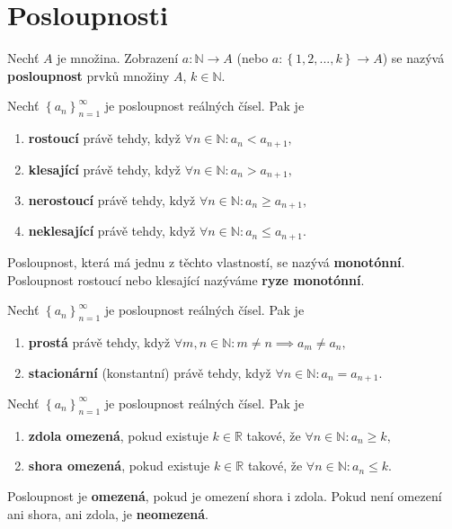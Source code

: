 \section{Posloupnosti}
\begin{definition}
Nechť $A$ je množina. Zobrazení $a:\mathbb N\to A$ (nebo $a:\left \{ 1,2,...,k \right \} \to A$)
se nazývá \textbf{posloupnost} prvků množiny $A$, $k\in \mathbb N.$
\end{definition}

\begin{definition}
Nechť $\left \{ a_n \right \}_{n=1}^\infty $ je posloupnost reálných čísel. Pak je
\begin{enumerate}[$i.$]
\item \textbf{rostoucí} právě tehdy, když $\forall n \in \mathbb N: a_n< a_{n+1},$
\item \textbf{klesající} právě tehdy, když $\forall n \in \mathbb N: a_n> a_{n+1},$
\item \textbf{nerostoucí} právě tehdy, když $\forall n \in \mathbb N: a_n\geq a_{n+1},$
\item \textbf{neklesající} právě tehdy, když $\forall n \in \mathbb N: a_n\leq a_{n+1}.$
\end{enumerate}
Posloupnost, která má jednu z těchto vlastností, se nazývá \textbf{monotónní}.
Posloupnost rostoucí nebo klesající nazýváme \textbf{ryze monotónní}.
\end{definition}

\begin{definition}
    Nechť $\left \{ a_n \right \}_{n=1}^\infty $ je posloupnost reálných čísel. Pak je
    \begin{enumerate}[$i.$]
    \item \textbf{prostá} právě tehdy, když $\forall m,n\in \mathbb N: m\ne n \implies a_m\ne a_n,$
   	\item \textbf{stacionární} (konstantní) právě tehdy, když $\forall n \in \mathbb N:a_n = a_{n+1}.$
    \end{enumerate}
\end{definition}

\begin{definition}
    Nechť $\left \{ a_n \right \}_{n=1}^\infty $ je posloupnost reálných čísel. Pak je
    \begin{enumerate}[$i.$]
    \item \textbf{zdola omezená}, pokud existuje $k\in \mathbb R$ takové, že
    $\forall n \in \mathbb N: a_n \geq k,$
   	\item \textbf{shora omezená}, pokud existuje $k\in \mathbb R$ takové, že
    $\forall n \in \mathbb N: a_n \leq k.$
    \end{enumerate}
    Posloupnost je \textbf{omezená}, pokud je omezení shora i zdola.
    Pokud není omezení ani shora, ani zdola, je \textbf{neomezená}.
\end{definition}

